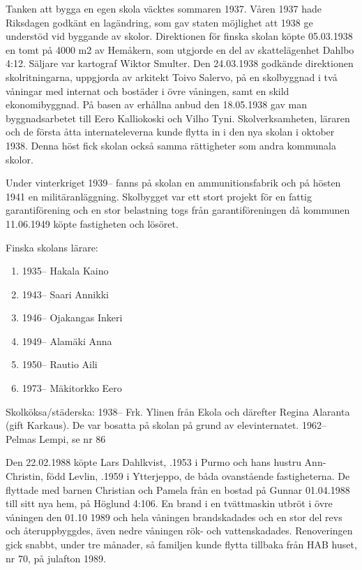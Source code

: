 Tanken att bygga en egen skola väcktes sommaren 1937. Våren 1937 hade Riksdagen godkänt en lagändring, som gav staten möjlighet att 1938 ge understöd vid byggande av skolor. Direktionen för finska skolan köpte	05.03.1938 en tomt på 4000 m2 av Hemåkern, som utgjorde en del av skattelägenhet Dahlbo 4:12. Säljare var kartograf Wiktor Smulter. Den	24.03.1938 godkände direktionen skolritningarna, uppgjorda av arkitekt Toivo Salervo, på en skolbyggnad i två våningar med internat och bostäder i övre våningen, samt en skild ekonomibyggnad. På basen av	erhållna anbud den 18.05.1938 gav man byggnadsarbetet till Eero Kalliokoski och Vilho Tyni. Skolverksamheten, läraren och de första åtta internateleverna kunde flytta in i den nya skolan i oktober 1938. Denna höst fick skolan också samma rättigheter som andra kommunala skolor.

Under vinterkriget 1939-- fanns på skolan en ammunitionsfabrik och	på hösten 1941 en militäranläggning. Skolbygget var ett stort projekt för en fattig garantiförening och en stor belastning togs från garantiföreningen då kommunen 11.06.1949 köpte	fastigheten och lösöret.

Finska skolans lärare:
\begin{enumerate}
  \item 1935-- Hakala Kaino
  \item 1943--	Saari Annikki
  \item 1946--	Ojakangas Inkeri
  \item 1949--	Alamäki Anna
  \item 1950--	Rautio Aili
  \item 1973--	Mäkitorkko Eero
\end{enumerate}

Skolköksa/städerska:
1938--	Frk. Ylinen från Ekola och därefter Regina Alaranta (gift Karkaus). De var bosatta på skolan på grund av 		elevinternatet.
1962--	Pelmas Lempi, se nr 86




Den 22.02.1988 köpte Lars Dahlkvist, .1953 i Purmo och	hans hustru Ann-Christin, född Levlin, .1959 i Ytterjeppo, de båda ovanstående fastigheterna. De flyttade med barnen Christian och Pamela från en bostad på Gunnar 01.04.1988 till sitt nya hem, på Höglund	4:106. En brand i en tvättmaskin utbröt i övre våningen den 01.10 1989 	och hela våningen brandskadades och en stor del revs och 	återuppbyggdes, även nedre våningen rök- och vattenskadades. 	Renoveringen gick snabbt, under tre månader, så familjen kunde flytta tillbaka från HAB huset, nr 70, på	julafton 1989.

